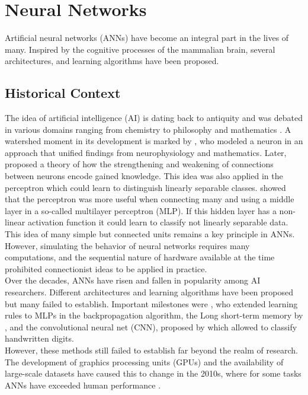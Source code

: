 \documentclass[a4paper,cleardoubleempty,BCOR1cm, 11pt]{report}
\begin{document}
\section{Neural Networks}
Artificial neural networks (ANNs) have become an integral part in the lives of many. Inspired by the cognitive processes of the mammalian brain, several architectures, and learning algorithms have been proposed.

\subsection{Historical Context}
The idea of artificial intelligence (AI) is dating back to antiquity and was debated in various domains ranging from chemistry \cite{o1994alchemical} to philosophy and mathematics \cite{leibnizdissertatio}. A watershed moment in its development is marked by \citet{mcculloch1943logical}, who modeled a neuron in an approach that unified findings from neurophysiology and mathematics. Later, \citet{hebb19680} proposed a theory of how the strengthening and weakening of connections between neurons encode gained knowledge.  This idea was also applied in the perceptron \cite{rosenblatt1960perceptron} which could learn to distinguish linearly separable classes. 
\citet{marvin1969perceptrons} showed that the perceptron was more useful when connecting many and using a middle layer in a so-called multilayer perceptron (MLP). If this hidden layer has a non-linear activation function it could learn to classify not linearly separable data. This idea of many simple but connected units remains a key principle in ANNs.
However, simulating the behavior of neural networks requires many computations, and the sequential nature of hardware available at the time prohibited connectionist ideas to be applied in practice.\\
Over the decades, ANNs have risen and fallen in popularity among AI researchers. Different architectures and learning algorithms have been proposed but many failed to establish. Important milestones were \citet{rumelhart1986learning}, who extended learning rules to MLPs in the backpropagation algorithm, the Long short-term memory by \citet{hochreiter1997long}, and the convolutional neural net (CNN), proposed by \citet{lecun1995convolutional} which allowed to classify handwritten digits.\\
However, these methods still failed to establish far beyond the realm of research. The development of graphics processing units (GPUs) and the availability of large-scale datasets have caused this to change in the 2010s, where for some tasks ANNs have exceeded human performance \cite{ILSVRC15}.
\end{document}

